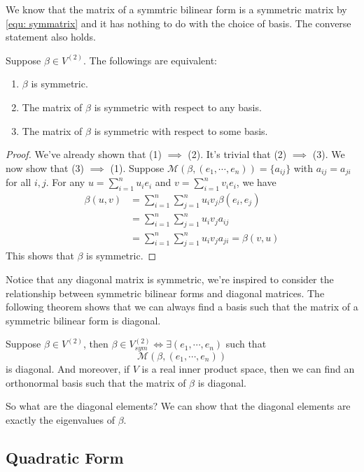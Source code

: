 We know that the matrix of a symmtric bilinear form is a symmetric matrix by \eqref{equ: symmatrix} and it has nothing to do with the choice of basis. The converse statement also holds.
\begin{theorem}
    Suppose $\beta \in V^{(2)}$. The followings are equivalent:
    \begin{enumerate}
        \item $\beta$ is symmetric.
        \item The matrix of $\beta$ is symmetric with respect to any basis.
        \item The matrix of $\beta$ is symmetric with respect to some basis.
    \end{enumerate}
\end{theorem}
\begin{proof}
    We've already shown that (1) $\implies$ (2). It's trivial that (2) $\implies$ (3). We now show that (3) $\implies$ (1). Suppose $\mathcal{M}(\beta, (e_1,\cdots,e_n))= \{a_{ij}\}$ with $a_{ij} = a_{ji}$ for all $i,j$.
    For any $u = \sum_{i=1}^{n} u_i e_i$ and $v = \sum_{i=1}^{n} v_i e_i$, we have
    $$\begin{aligned}
        \beta(u,v) &= \sum_{i=1}^{n} \sum_{j=1}^{n} u_i v_j \beta(e_i,e_j)\\
        & = \sum_{i=1}^{n} \sum_{j=1}^{n} u_i v_j a_{ij}\\
        & = \sum_{i=1}^{n} \sum_{j=1}^{n} u_i v_j a_{ji} = \beta(v,u)
    \end{aligned}$$
    This shows that $\beta$ is symmetric.
\end{proof}

Notice that any diagonal matrix is symmetric, we're inspired to consider the relationship between symmetric bilinear forms and diagonal matrices.
 The following theorem shows that we can always find a basis such that the matrix of a symmetric bilinear form is diagonal.
 \begin{theorem}
    Suppose $\beta \in V^{(2)}$, then $\beta \in V_{sym}^{(2)} \iff \exists (e_1,\cdots,e_n)$  such that $$\mathcal{M}(\beta, (e_1,\cdots,e_n))$$ is diagonal.
    And moreover, if $V$ is a real inner product space, then we can find an orthonormal basis such that the matrix of $\beta$ is diagonal.
 \end{theorem}

 So what are the diagonal elements? We can show that the diagonal elements are exactly the eigenvalues of $\beta$.

\subsection{Quadratic Form}
 

